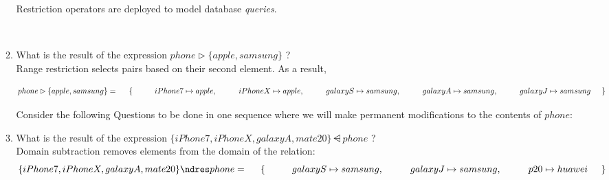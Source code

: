 \documentclass[12pt]{article}
\begin{document}
\begin{enumerate}
\begin{enumerate}
\noindent Restriction operators are deployed to model database \textit{queries}.


\ \\


\item What is the result of the expression  $phone \rhd \{ apple, samsung \}$ ?\\


\noindent Range restriction selects pairs based on their second element. As a result,

\[ 
phone \rhd \{ apple, samsung \} = \\

\hspace{5mm} \{ \\
\hspace{10mm} iPhone7 \mapsto apple,\\
\hspace{10mm} iPhoneX \mapsto apple,\\
\hspace{10mm} galaxyS \mapsto samsung,\\
\hspace{10mm} galaxyA \mapsto samsung,\\
\hspace{10mm} galaxyJ \mapsto samsung\\
\hspace{5mm} \}
\]


\newpage

\noindent Consider the following Questions to be done in one sequence where we will make permanent modifications to the contents of $phone$:\\


\item What is the result of the expression  $\{ iPhone7, iPhoneX, galaxyA, mate20 \} \ndres phone$ ?\\


\noindent  Domain subtraction removes elements from the domain of the relation:\\


\[
\{ iPhone7, iPhoneX, galaxyA, mate20 \} \ndres phone = \\

\hspace{5mm} \{ \\
\hspace{10mm} galaxyS \mapsto samsung,\\
\hspace{10mm} galaxyJ \mapsto samsung,\\
\hspace{10mm} p20 \mapsto huawei\\
\hspace{5mm} \}

\]
\end{enumerate}
\end{enumerate}
\end{document}
